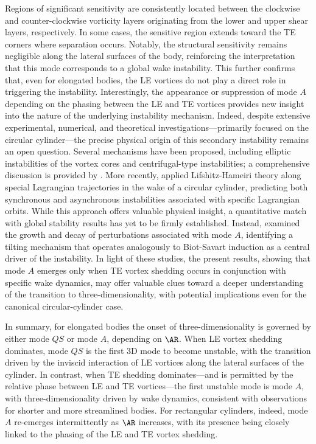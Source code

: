 %
Regions of significant sensitivity are consistently located between the clockwise and counter-clockwise vorticity layers originating from the lower and upper shear layers, respectively. In some cases, the sensitive region extends toward the TE corners where separation occurs. Notably, the structural sensitivity remains negligible along the lateral surfaces of the body, reinforcing the interpretation that this mode corresponds to a global wake instability. This further confirms that, even for elongated bodies, the LE vortices do not play a direct role in triggering the instability.
%
Interestingly, the appearance or suppression of mode $A$ depending on the phasing between the LE and TE vortices provides new insight into the nature of the underlying instability mechanism. Indeed, despite extensive experimental, numerical, and theoretical investigations---primarily focused on the circular cylinder---the precise physical origin of this secondary instability remains an open question. Several mechanisms have been proposed, including elliptic instabilities of the vortex cores \citep{williamson-1996,leweke-williamson-1998} and centrifugal-type instabilities; a comprehensive discussion is provided by \citet{thompson-etal-2001}.
%
More recently, \cite{giannetti-2015} applied Lifshitz-Hameiri theory along special Lagrangian trajectories in the wake of a circular cylinder, predicting both synchronous and asynchronous instabilities associated with specific Lagrangian orbits. While this approach offers valuable physical insight, a quantitative match with global stability results has yet to be firmly established. Instead, \cite{aleksyuk-heil-2023} examined the growth and decay of perturbations associated with mode $A$, identifying a tilting mechanism that operates analogously to Biot-Savart induction as a central driver of the instability.
%
In light of these studies, the present results, showing that mode $A$ emerges only when TE vortex shedding occurs in conjunction with specific wake dynamics, may offer valuable clues toward a deeper understanding of the transition to three-dimensionality, with potential implications even for the canonical circular-cylinder case.

In summary, for elongated bodies the onset of three-dimensionality is governed by either mode $QS$ or mode $A$, depending on $\AR$. When LE vortex shedding dominates, mode $QS$ is the first 3D mode to become unstable, with the transition driven by the inviscid interaction of LE vortices along the lateral surfaces of the cylinder. In contrast, when TE shedding dominates---and is permitted by the relative phase between LE and TE vortices---the first unstable mode is mode $A$, with three-dimensionality driven by wake dynamics, consistent with observations for shorter and more streamlined bodies. For rectangular cylinders, indeed, mode $A$ re-emerges intermittently as $\AR$ increases, with its presence being closely linked to the phasing of the LE and TE vortex shedding.

